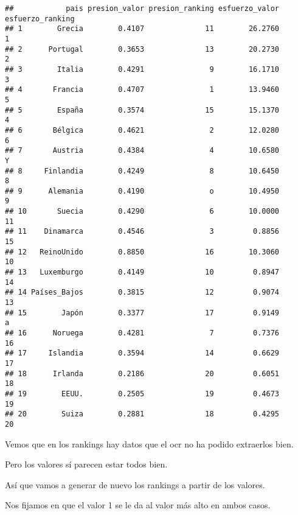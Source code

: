 \documentclass[
]{article}
\begin{document}
\begin{verbatim}
##            pais presion_valor presion_ranking esfuerzo_valor esfuerzo_ranking
## 1        Grecia        0.4107              11        26.2760                1
## 2      Portugal        0.3653              13        20.2730                2
## 3        Italia        0.4291               9        16.1710                3
## 4       Francia        0.4707               1        13.9460                5
## 5        España        0.3574              15        15.1370                4
## 6       Bélgica        0.4621               2        12.0280                6
## 7       Austria        0.4384               4        10.6580                Y
## 8     Finlandia        0.4249               8        10.6450                8
## 9      Alemania        0.4190               o        10.4950                9
## 10       Suecia        0.4290               6        10.0000               11
## 11    Dinamarca        0.4546               3         0.8856               15
## 12   ReinoUnido        0.8850              16        10.3060               10
## 13   Luxemburgo        0.4149              10         0.8947               14
## 14 Países_Bajos        0.3815              12         0.9074               13
## 15        Japón        0.3377              17         0.9149                a
## 16      Noruega        0.4281               7         0.7376               16
## 17     Islandia        0.3594              14         0.6629               17
## 18      Irlanda        0.2186              20         0.6051               18
## 19        EEUU.        0.2505              19         0.4673               19
## 20        Suiza        0.2881              18         0.4295               20
\end{verbatim}

Vemos que en los rankings hay datos que el ocr no ha podido extraerlos
bien.

Pero los valores sí parecen estar todos bien.

Así que vamos a generar de nuevo los rankings a partir de los valores.

Nos fijamos en que el valor 1 se le da al valor más alto en ambos casos.
\end{document}
